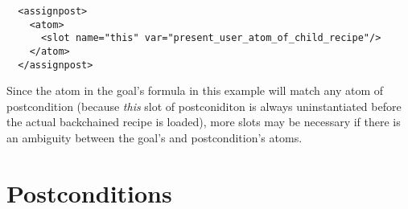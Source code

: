 \lstset{language=XML}
\begin{lstlisting}
  <assignpost>
    <atom>
      <slot name="this" var="present_user_atom_of_child_recipe"/>
    </atom>
  </assignpost>
\end{lstlisting}

Since the atom in the goal's formula in this example will match any atom of postcondition (because \textsl{this} slot of postconiditon is always uninstantiated before the actual backchained recipe is loaded), more slots may be necessary if there is an ambiguity between the goal's and postcondition's atoms.
\section{Postconditions}

